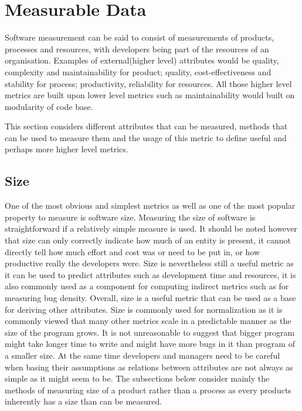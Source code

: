 \documentclass[11pt]{article}
\begin{document}
\section{Measurable Data}
\label{sec:Methods}

Software measurement can be said to consist of measurements of products, processes and resources, with developers being part of the resources of an organisation.\cite{Fenton:2014:SMR:2700539} Examples of external(higher level) attributes would be quality, complexity and maintainability for product; quality, cost-effectiveness and stability for process; productivity, reliability for resources. All those higher level metrics are built upon lower level metrics such as maintainability would built on modularity of code base.

This section considers different attributes that can be measured, methods that can be used to measure them and the usage of this metric to define useful and perhaps more higher level metrics.

\subsection{Size}
One of the most obvious and simplest metrics as well as one of the most popular property to measure is software size. Measuring the size of software is straightforward if a relatively simple measure is used. It should be noted however that size can only correctly indicate how much of an entity is present, it cannot directly tell how much effort and cost was or need to be put in, or how productive really the developers were. Size is nevertheless still a useful metric as it can be used to predict attributes such as development time and resources, it is also commonly used as a component for computing indirect metrics such as for measuring bug density.
Overall, size is a useful metric that can be used as a base for deriving other attributes. Size is commonly used for normalization as it is commonly viewed that many other metrics scale in a predictable manner as the size of the program grows. It is not unreasonable to suggest that bigger program might take longer time to write and might have more bugs in it than program of a smaller size. At the same time developers and managers need to be careful when basing their assumptions as relations between attributes are not always as simple as it might seem to be.
The subsections below consider mainly the methods of measuring size of a product rather than a process as every products inherently has a size than can be measured.
\end{document}
